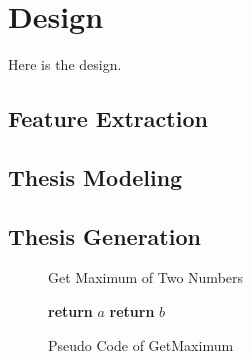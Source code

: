 \chapter{Design} \label{chapter:design}

Here is the design.

\section{Feature Extraction}

\section{Thesis Modeling}

\section{Thesis Generation}

\begin{figure}[h!]
\begin{algorithm}[H]
\caption{Get Maximum of Two Numbers}
\begin{algorithmic}[1]
  \State \textbf{return} $a$
\Else
  \State \textbf{return} $b$
\EndIf
\EndProcedure
\end{algorithmic}
\end{algorithm}
\caption{Pseudo Code of GetMaximum}
\label{figure:pseudo_code_of_get_maximum}
\end{figure}